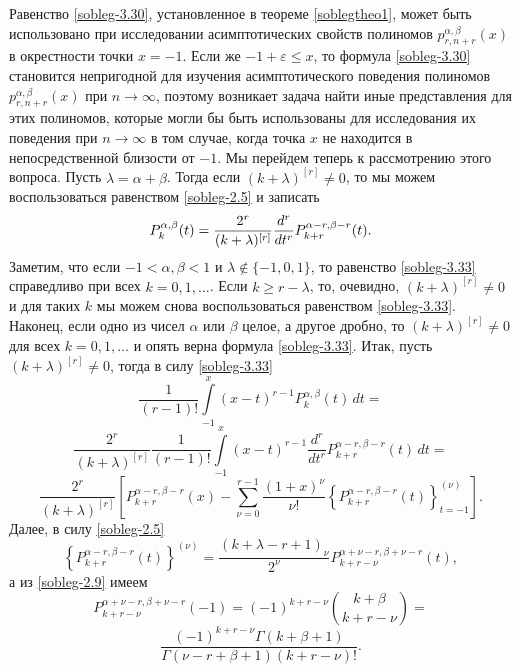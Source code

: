 Равенство \eqref{sobleg-3.30}, установленное в теореме \ref{soblegtheo1}, может быть использовано при исследовании асимптотических свойств полиномов $p_{r,n+r}^{\alpha,\beta}(x)$ в окрестности точки $x=-1$. Если же $-1+\varepsilon\le x$, то формула  \eqref{sobleg-3.30} становится непригодной для изучения асимптотического  поведения полиномов  $p_{r,n+r}^{\alpha,\beta}(x)$ при $n\to\infty$, поэтому возникает задача найти иные представления для этих полиномов, которые могли бы быть использованы для исследования их поведения при $n\to\infty$ в том случае, когда точка $x$ не находится в непосредственной близости от $-1$. Мы перейдем теперь к рассмотрению этого вопроса. Пусть $\lambda=\alpha+\beta$. Тогда если $(k+\lambda)^{[r]}\neq0$,
то мы можем воспользоваться равенством \eqref{sobleg-2.5} и записать
\begin{equation}\label{sobleg-3.33}
P^{\alpha,\beta}_k(t)={2^r \over (k+\lambda )^{[r]}}\frac{d^r}{dt^r}P_{k+r}^{\alpha-r,\beta-r}(t).
\end{equation}
Заметим, что если $-1<\alpha,\beta<1$ и $\lambda\notin\{-1,0,1\}$, то
 равенство \eqref{sobleg-3.33} справедливо при всех
$k=0,1,\ldots$. Если  $k\ge r-\lambda$, то, очевидно,
$(k+\lambda)^{[r]}\neq0$ и для таких $k$ мы
можем снова воспользоваться равенством \eqref{sobleg-3.33}. Наконец, если одно из чисел $\alpha$ или $\beta$ целое, а другое дробно, то
$(k+\lambda)^{[r]}\neq0$ для всех $k=0,1,\ldots$ и опять верна формула \eqref{sobleg-3.33}. Итак, пусть $(k+\lambda)^{[r]}\neq0$, тогда в силу  \eqref{sobleg-3.33}
$$
\frac{1}{(r-1)!}\int\limits^x_{-1}(x-t)^{r-1}P_k^{\alpha,\beta}(t)\,dt=
$$
$$
\frac{2^r}{(k+\lambda)^{[r]}}\frac{1}{(r-1)!}\int\limits^x_{-1}(x-t)^{r-1}
\frac{d^r}{dt^r}P_{k+r}^{\alpha-r,\beta-r}(t)\,dt=
$$
\begin{equation}\label{sobleg-3.34}
\frac{2^r}{(k+\lambda)^{[r]}}\left[P_{k+r}^{\alpha-r,\beta-r}(x)-\sum^{r-1}_{\nu=0}
\frac{(1+x)^\nu}{\nu!}\left\{P_{k+r}^{\alpha-r,\beta-r}(t)
\right\}_{t=-1}^{(\nu)}\right].
\end{equation}
 Далее, в силу \eqref{sobleg-2.5}
 \begin{equation}\label{sobleg-3.35}
\left\{P_{k+r}^{\alpha-r,\beta-r}(t)\right\}^{(\nu)}=
\frac{(k+\lambda-r+1)_\nu}{2^\nu}P_{k+r-\nu}^{\alpha+\nu-r,\beta+\nu-r}(t),
\end{equation}
а из \eqref{sobleg-2.9} имеем
$$P_{k+r-\nu}^{\alpha+\nu-r,\beta+\nu-r}(-1)=(-1)^{k+r-\nu}{k+\beta\choose k+r-\nu}=$$
\begin{equation}\label{sobleg-3.36}
\frac{(-1)^{k+r-\nu}\Gamma(k+\beta+1)}{\Gamma(\nu-r+\beta+1)(k+r-\nu)!}.
\end{equation}
